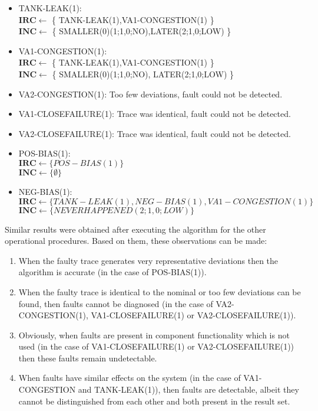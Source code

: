 \documentclass[conference]{IEEEtran}
\begin{document}
\begin{itemize}

\item TANK-LEAK(1): \\ $\mathbf{IRC} \leftarrow$ \{ TANK-LEAK(1),VA1-CONGESTION(1) \} \\ $\mathbf{INC} \leftarrow$ \{ SMALLER(0)(1;1,0;NO),LATER(2;1,0;LOW) \}

\item VA1-CONGESTION(1): \\ $\mathbf{IRC} \leftarrow $ \{ TANK-LEAK(1),VA1-CONGESTION(1) \}\\ $\mathbf{INC} \leftarrow$ \{ SMALLER(0)(1;1,0;NO), LATER(2;1,0;LOW) \}

\item VA2-CONGESTION(1): Too few deviations, fault could not be detected.

\item VA1-CLOSEFAILURE(1): Trace was identical, fault could not be detected.

\item VA2-CLOSEFAILURE(1): Trace was identical, fault could not be detected.

\item POS-BIAS(1): \\ $\mathbf{IRC} \leftarrow \{ POS-BIAS(1) \}$ \\ $\mathbf{INC} \leftarrow \{ \emptyset \} $

\item NEG-BIAS(1): \\ $\mathbf{IRC} \leftarrow \{ TANK-LEAK(1), NEG-BIAS(1), VA1-CONGESTION(1) \}$ \\ $\mathbf{INC} \leftarrow \{ NEVERHAPPENED(2;1,0;LOW) \}$

\end{itemize}

Similar results were obtained after executing the algorithm for the other operational procedures. Based on them, these observations can be made:
\begin{enumerate}
\item When the faulty trace generates very representative deviations then the algorithm is accurate (in the case of POS-BIAS(1)).
\item When the faulty trace is identical to the nominal or too few deviations can be found, then faults cannot be diagnosed (in the case of VA2-CONGESTION(1), VA1-CLOSEFAILURE(1) or VA2-CLOSEFAILURE(1)).
\item Obviously, when faults are present in component functionality which is not used (in the case of VA1-CLOSEFAILURE(1) or VA2-CLOSEFAILURE(1)) then these faults remain undetectable.
\item When faults have similar effects on the system (in the case of VA1-CONGESTION and TANK-LEAK(1)), then faults are detectable, albeit they cannot be distinguished from each other and both present in the result set.
\end{enumerate}
\end{document}
